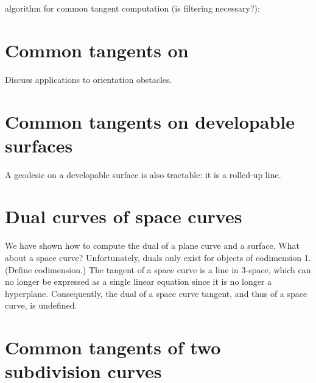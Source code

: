 algorithm for common tangent computation (is filtering necessary?):

\section{Common tangents on }

Discuss applications to orientation obstacles.

\section{Common tangents on developable surfaces}

A geodesic on a developable surface is also tractable:
it is a rolled-up line.


\section{Dual curves of space curves}

We have shown how to compute the dual of a plane curve and a surface.
What about a space curve?
Unfortunately, duals only exist for objects of codimension 1.
(Define codimension.)
The tangent of a space curve is a line in 3-space, which can no longer
be expressed as a single linear equation since it is no longer a hyperplane.
Consequently, the dual of a space curve tangent, and thus of a space curve,
is undefined.

\section{Common tangents of two subdivision curves}



